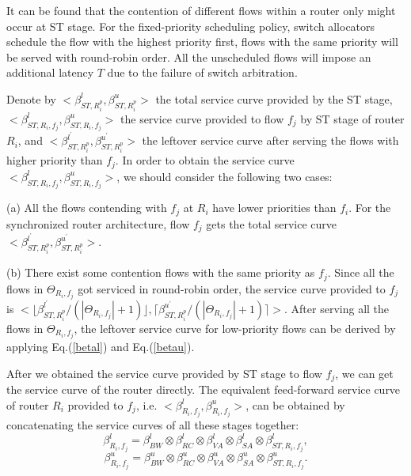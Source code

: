 \documentclass[preprint]{elsarticle}
\begin{document}
It can be found that the contention of different flows within a router only might occur at ST stage. For the fixed-priority scheduling policy, switch allocators schedule the flow with the highest priority first, flows with the same priority will be served with round-robin order. All the unscheduled flows will impose an additional latency $T$ due to the failure of switch arbitration.

Denote by $<\beta_{ST,R_i^{p}}^l,\beta_{ST,R_i^{p}}^u>$ the total service curve provided by the ST stage, $<\beta_{ST,R_i,f_j}^l,\beta_{ST,R_i,f_j}^u>$ the service curve provided to flow $f_j$ by ST stage of router $R_i$, and $<\beta_{ST,R_i^{p}}^{l^\prime},\beta_{ST,R_i^{p}}^{u^\prime}>$ the leftover service curve after serving the flows with higher priority than $f_j$. In order to obtain the service curve $<\beta_{ST,R_i,f_j}^l,\beta_{ST,R_i,f_j}^u>$, we should consider the following two cases:

(a) All the flows contending with $f_j$ at $R_i$ have lower priorities than $f_i$. For the synchronized router architecture, flow $f_j$ gets the total service curve $<\beta_{ST,R_i^{p}}^{l^\prime},\beta_{ST,R_i^{p}}^{u^\prime}>$.

(b) There exist some contention flows with the same priority as $f_j$. Since all the flows in $\Theta_{R_i,f_j}$ got serviced in round-robin order, the service curve provided to $f_j$ is $<\lfloor\beta^{l^\prime}_{ST,R_i^{p}}/(|\Theta_{R_i,f_j}|+1)\rfloor,\lceil\beta^{u^\prime}_{ST,R_i^{p}}/(|\Theta_{R_i,f_j}|+1)\rceil>$. After serving all the flows in $\Theta_{R_i,f_j}$, the leftover service curve for low-priority flows can be derived by applying Eq.(\ref{betal}) and Eq.(\ref{betau}).

After we obtained the service curve provided by ST stage to flow $f_j$, we can get the service curve of the router directly. The equivalent feed-forward service curve of router $R_i$ provided to $f_j$, i.e. $<\beta_{R_i,f_j}^l,\beta_{R_i,f_j}^u>$, can be obtained by concatenating the service curves of all these stages together:
$$\beta_{R_i,f_j}^l=\beta_{BW}^l\otimes\beta_{RC}^l\otimes\beta_{VA}^l\otimes\beta_{SA}^l\otimes \beta_{ST,R_i,f_j}^l,$$
$$\beta_{R_i,f_j}^u=\beta_{BW}^u\otimes\beta_{RC}^u\otimes\beta_{VA}^u\otimes\beta_{SA}^u\otimes \beta_{ST,R_i,f_j}^u.$$
\end{document}
